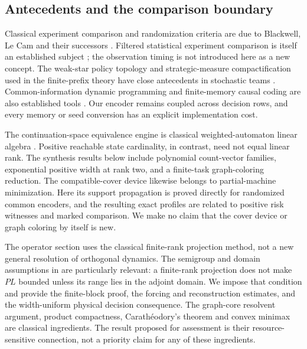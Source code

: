 \subsection{Antecedents and the comparison boundary}
Classical experiment comparison and randomization criteria are due to
Blackwell, Le Cam and their successors
\cite{Blackwell1953,LeCam1964,Torgersen1991}. Filtered statistical
experiment comparison is itself an established subject
\cite{Norberg2002}; the observation timing is not introduced here as a
new concept. The weak-star policy topology and strategic-measure
compactification used in the finite-prefix theory have close antecedents
in stochastic teams \cite{Saldi2017Topology,YukselSaldi2017}.
Common-information dynamic programming and finite-memory causal coding
are also established tools
\cite{NayyarMahajanTeneketzis2013,Witsenhausen1979,YukselCausal2010}.
Our encoder remains coupled across decision rows, and every memory or
seed conversion has an explicit implementation cost.

The continuation-space equivalence engine is classical weighted-automaton
linear algebra \cite{Kiefer2020,Tzeng1992}. Positive reachable state
cardinality, in contrast, need not equal linear rank. The synthesis
results below include polynomial count-vector families, exponential
positive width at rank two, and a finite-task graph-coloring reduction.
The compatible-cover device likewise belongs to partial-machine
minimization. Here its support propagation is proved directly for
randomized common encoders, and the resulting exact profiles are related
to positive risk witnesses and marked comparison. We make no claim that
the cover device or graph coloring by itself is new.

The operator section uses the classical finite-rank projection method,
not a new general resolution of orthogonal dynamics. The semigroup and
domain assumptions in \cite{WidderZimmerSchilling2025,WidderSchilling2026}
are particularly relevant: a finite-rank projection does not make $PL$
bounded unless its range lies in the adjoint domain. We impose that
condition and provide the finite-block proof, the forcing and
reconstruction estimates, and the width-uniform physical decision
consequence. The graph-core resolvent argument, product compactness,
Carath\'eodory's theorem and convex minimax are classical ingredients.
The result proposed for assessment is their resource-sensitive
connection, not a priority claim for any of these ingredients.


